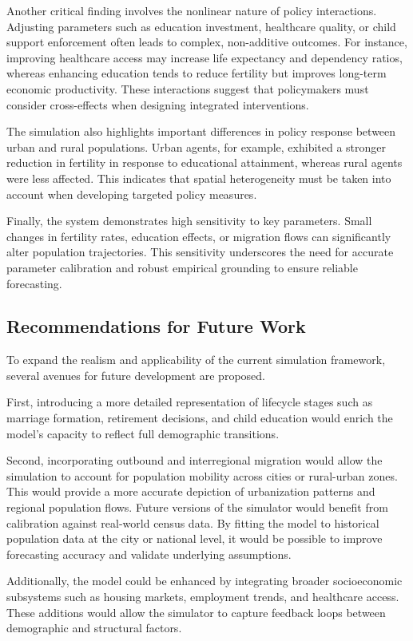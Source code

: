 \documentclass[12pt]{article}
\begin{document}
Another critical finding involves the nonlinear nature of policy interactions. Adjusting parameters such as education investment, healthcare quality, or child support enforcement often leads to complex, non-additive outcomes. For instance, improving healthcare access may increase life expectancy and dependency ratios, whereas enhancing education tends to reduce fertility but improves long-term economic productivity. These interactions suggest that policymakers must consider cross-effects when designing integrated interventions.

The simulation also highlights important differences in policy response between urban and rural populations. Urban agents, for example, exhibited a stronger reduction in fertility in response to educational attainment, whereas rural agents were less affected. This indicates that spatial heterogeneity must be taken into account when developing targeted policy measures.

Finally, the system demonstrates high sensitivity to key parameters. Small changes in fertility rates, education effects, or migration flows can significantly alter population trajectories. This sensitivity underscores the need for accurate parameter calibration and robust empirical grounding to ensure reliable forecasting.

\subsection{Recommendations for Future Work}

To expand the realism and applicability of the current simulation framework, several avenues for future development are proposed. 

First, introducing a more detailed representation of lifecycle stages such as marriage formation, retirement decisions, and child education would enrich the model’s capacity to reflect full demographic transitions.

Second, incorporating outbound and interregional migration would allow the simulation to account for population mobility across cities or rural-urban zones. This would provide a more accurate depiction of urbanization patterns and regional population flows. Future versions of the simulator would benefit from calibration against real-world census data. By fitting the model to historical population data at the city or national level, it would be possible to improve forecasting accuracy and validate underlying assumptions.

Additionally, the model could be enhanced by integrating broader socioeconomic subsystems such as housing markets, employment trends, and healthcare access. These additions would allow the simulator to capture feedback loops between demographic and structural factors.
\end{document}
